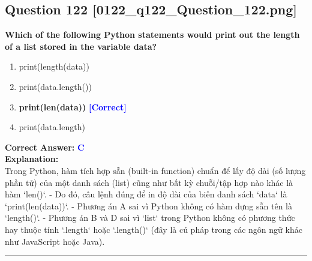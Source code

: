 \documentclass[11pt,a4paper]{article}
\begin{document}
\begin{minipage}{\textwidth}
\subsection*{Question 122 \quad \footnotesize{[0122_q122_Question_122.png]}}
\noindent \textbf{Which of the following Python statements would print out the length of a list stored in the variable data?}

\begin{enumerate}[label=\Alph*.]
    \item print(length(data))
    \item print(data.length())
    \item \textbf{print(len(data))} \hfill \textcolor{blue}{\textbf{[Correct]}}
    \item print(data.length)
\end{enumerate}

\noindent \textbf{Correct Answer:} \textcolor{blue}{\textbf{C}} \\[4pt]
\noindent \textbf{Explanation:}\\
Trong Python, hàm tích hợp sẵn (built-in function) chuẩn để lấy độ dài (số lượng phần tử) của một danh sách (list) cũng như bất kỳ chuỗi/tập hợp nào khác là hàm `len()`.\newline
- Do đó, câu lệnh đúng để in độ dài của biến danh sách `data` là `print(len(data))`.\newline
- Phương án A sai vì Python không có hàm dựng sẵn tên là `length()`.\newline
- Phương án B và D sai vì `list` trong Python không có phương thức hay thuộc tính `.length` hoặc `.length()` (đây là cú pháp trong các ngôn ngữ khác như JavaScript hoặc Java).
\end{minipage}
\vspace{0.8cm}
\hrule
\vspace{0.5cm}
\end{document}
